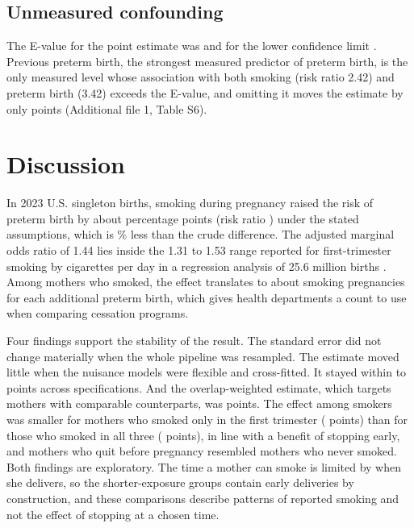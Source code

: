 \documentclass[11pt,letterpaper]{article}
\begin{document}
\begin{table}[htbp]
\centering
\caption{Trimester of smoking and third-trimester intensity, each group against mothers who never smoked (full 2023 natality file; risk difference in percentage points).}\label{tab:tri}
\resizebox{\textwidth}{!}{}
\end{table}

\subsection*{Unmeasured confounding}
The E-value for the point estimate was \EV{} and for the lower confidence limit \EVlo{}. Previous preterm birth, the strongest measured predictor of preterm birth, is the only measured level whose association with both smoking (risk ratio 2.42) and preterm birth (3.42) exceeds the E-value, and omitting it moves the estimate by only \PPChange{} points (Additional file 1, Table S6).

\section*{Discussion}

In 2023 U.S. singleton births, smoking during pregnancy raised the risk of preterm birth by about \RDmain{} percentage points (risk ratio \RRmain{}) under the stated assumptions, which is \ReducePct{}\% less than the crude difference. The adjusted marginal odds ratio of 1.44 lies inside the 1.31 to 1.53 range reported for first-trimester smoking by cigarettes per day in a regression analysis of 25.6 million births \cite{liu2020}. Among mothers who smoked, the effect translates to about \OneIn{} smoking pregnancies for each additional preterm birth, which gives health departments a count to use when comparing cessation programs.

Four findings support the stability of the result. The standard error did not change materially when the whole pipeline was resampled. The estimate moved little when the nuisance models were flexible and cross-fitted. It stayed within \RangeMin{} to \RangeMax{} points across specifications. And the overlap-weighted estimate, which targets mothers with comparable counterparts, was \ATO{} points. The effect among smokers was smaller for mothers who smoked only in the first trimester (\TriAATT{} points) than for those who smoked in all three (\TriCATT{} points), in line with a benefit of stopping early, and mothers who quit before pregnancy resembled mothers who never smoked. Both findings are exploratory. The time a mother can smoke is limited by when she delivers, so the shorter-exposure groups contain early deliveries by construction, and these comparisons describe patterns of reported smoking and not the effect of stopping at a chosen time.
\end{document}
